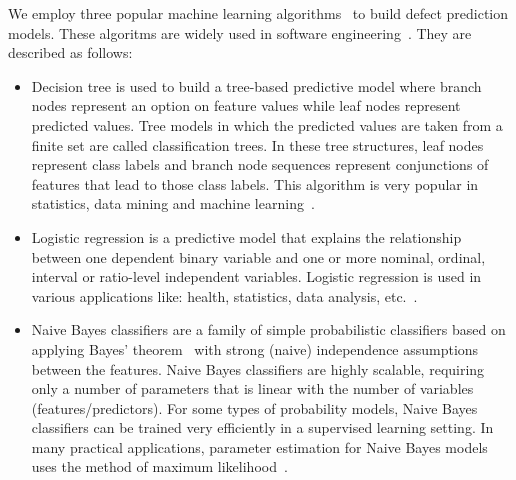 We employ three popular machine learning algorithms~\cite{bishop2006pattern} to build defect prediction models. These algoritms are widely used in software engineering~\cite{wang2016automatically, wang2013using, jing2014dictionary}. They are described as follows: 
\begin{itemize}
	\item Decision tree is used to build a tree-based predictive model where branch nodes represent an option on feature values while leaf nodes represent predicted values. Tree models in which the predicted values are taken from a finite set are called classification trees. In these tree structures, leaf nodes represent class labels and branch node sequences represent conjunctions of features that lead to those class labels. This algorithm is very popular in statistics, data mining and machine learning~\cite{safavian1991survey}.
	\item Logistic regression is a predictive model that explains the relationship between one dependent binary variable and one or more nominal, ordinal, interval or ratio-level independent variables. Logistic regression is used in various applications like: health, statistics, data analysis, etc.~\cite{hosmer2013applied}.
	\item Naive Bayes classifiers are a family of simple probabilistic classifiers based on applying Bayes' theorem~\cite{vapnik1998statistical} with strong (naive) independence assumptions between the features. Naive Bayes classifiers are highly scalable, requiring only a number of parameters that is linear with the number of variables (features/predictors). For some types of probability models, Naive Bayes classifiers can be trained very efficiently in a supervised learning setting. In many practical applications, parameter estimation for Naive Bayes models uses the method of maximum likelihood~\cite{pan2002maximum}.
\end{itemize}




